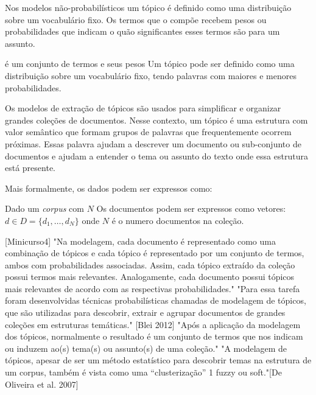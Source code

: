Nos modelos não-probabilísticos um tópico é definido como uma distribuição sobre um vocabulário fixo. Os termos que o compõe recebem pesos ou probabilidades que indicam o quão significantes esses termos são para um assunto.



é um conjunto de termos e seus pesos 
Um tópico pode ser definido como uma distribuição sobre um vocabulário fixo, tendo palavras com maiores e menores probabilidades.

Os modelos de extração de tópicos são usados para simplificar e organizar grandes coleções de documentos. Nesse contexto, um tópico é uma estrutura com valor semântico que formam grupos de palavras que frequentemente ocorrem próximas. Essas palavra ajudam a descrever um documento ou sub-conjunto de documentos e ajudam a entender o tema ou assunto do texto onde essa estrutura está presente.


Mais formalmente, os dados podem ser expressos como:

Dado um \textit{corpus} com $N$ 
Os documentos podem ser expressos como vetores: $ d \in D = \{d_1,\dots,d_N\}$ onde $N$ é o numero documentos na coleção. 



[Minicurso4] 
"Na modelagem, cada documento é representado como uma combinação de tópicos e cada tópico é representado por um conjunto de termos, ambos com probabilidades associadas. Assim, cada tópico extraído da coleção possui termos mais relevantes. Analogamente, cada documento possui tópicos mais relevantes de acordo com as respectivas probabilidades."
"Para essa tarefa foram desenvolvidas técnicas probabilísticas chamadas de modelagem de tópicos, que são utilizadas para descobrir, extrair e agrupar documentos de grandes coleções em estruturas temáticas." [Blei 2012]
"Após a aplicação da modelagem dos tópicos, normalmente o resultado é um conjunto de termos que nos indicam ou induzem ao(s) tema(s) ou assunto(s) de uma coleção."
"A modelagem de tópicos, apesar de ser um método estatístico para descobrir temas na estrutura de um corpus, também é vista como uma “clusterização” 1 fuzzy ou soft."[De Oliveira et al. 2007]

